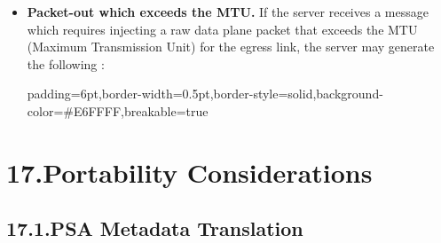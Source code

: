 \documentclass[11pt]{article}
\begin{document}
{\begin{itemize}
\item{}
\textbf{Packet-out which exceeds the MTU.} If the server receives a 
message which requires injecting a raw data plane packet that exceeds the MTU
(Maximum Transmission Unit) for the egress link, the server may generate the
following :%

\begin{mdbmargintb}{6pt}{6pt}%
\begin{mdblock}{padding=6pt,border-width=0.5pt,border-style=solid,background-color=\#E6FFFF,breakable=true}%
\begin{mdpre}%
\end{mdpre}%
\end{mdblock}%
\end{mdbmargintb}%
\end{itemize}%

\section{17.\hspace*{0.5em}Portability Considerations}\label{sec-portability-considerations}%

\subsection{17.1.\hspace*{0.5em}PSA Metadata Translation}\label{sec-psa-metadata-translation}%

}
\end{document}
